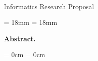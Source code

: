 \thispagestyle{plain}

\begin{center}
  \Huge
  \textbf{\@title}\\
  \vspace{.5em}
  \normalsize
  Informatics Research Proposal\\
  \@author
  \vspace{.4em}
\end{center}

\newcommand{\abstractmargin}{18mm}

\leftskip  = \abstractmargin
\rightskip = \abstractmargin

\small
\noindent
\textbf{Abstract.}


\leftskip  = 0cm
\rightskip = 0cm
